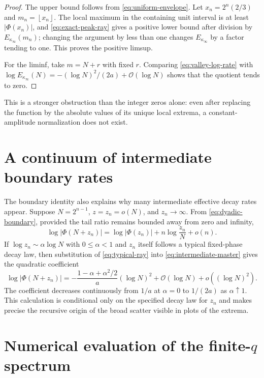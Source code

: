 \documentclass[11pt,oneside]{article}
\theoremstyle{definition}
\theoremstyle{remark}
\newcommand{\Phiup}{\Phi}
\newcommand{\bigO}{\mathcal O}
\newcommand{\floor}[1]{\left\lfloor #1\right\rfloor}
\newcommand{\abs}[1]{\left|#1\right|}
\begin{document}
\begin{proof}
The upper bound follows from \eqref{eq:uniform-envelope}.  Let
$x_n=2^n(2/3)$ and $m_n=\floor{x_n}$.  The local maximum in the containing unit interval is
at least $\abs{\Phiup(x_n)}$, and \eqref{eq:exact-peak-ray} gives a positive lower bound
after division by $E_{\kappa_\infty}(m_n)$; changing the argument by less than one changes
$E_{\kappa_\infty}$ by a factor tending to one.  This proves the positive limsup.

For the liminf, take $m=N+r$ with fixed $r$.  Comparing
\eqref{eq:valley-log-rate} with
$\log E_{\kappa_\infty}(N)=-(\log N)^2/(2a)+\bigO(\log N)$ shows that the quotient tends to
zero.
\end{proof}

This is a stronger obstruction than the integer zeros alone: even after replacing the
function by the absolute values of its unique local extrema, a constant-amplitude
normalization does not exist.

\section{A continuum of intermediate boundary rates}
\label{sec:intermediate-rates}

The boundary identity also explains why many intermediate effective decay rates appear.
Suppose $N=2^{n-1}$, $z=z_n=o(N)$, and $z_n\to\infty$.  From
\eqref{eq:dyadic-boundary}, provided the tail ratio remains bounded away from zero and
infinity,
\begin{equation}
 \log\abs{\Phiup(N+z_n)}
 =\log\abs{\Phiup(z_n)}+n\log\frac{z_n}{N}+o(n).
 \label{eq:intermediate-master}
\end{equation}
If $\log z_n\sim\alpha\log N$ with $0\le\alpha<1$ and $z_n$ itself follows a typical
fixed-phase decay law, then substitution of \eqref{eq:typical-ray} into
\eqref{eq:intermediate-master} gives the quadratic coefficient
\begin{equation}
 \log\abs{\Phiup(N+z_n)}
 =-\frac{1-\alpha+\alpha^2/2}{a}(\log N)^2
  +\bigO(\log N)+o((\log N)^2).
 \label{eq:intermediate-quadratic}
\end{equation}
The coefficient decreases continuously from $1/a$ at $\alpha=0$ to $1/(2a)$ as
$\alpha\uparrow1$.  This calculation is conditional only on the specified decay law for
$z_n$ and makes precise the recursive origin of the broad scatter visible in plots of the
extrema.

\section{Numerical evaluation of the finite-\texorpdfstring{$q$}{q} spectrum}
\label{sec:numerics}
\end{document}
